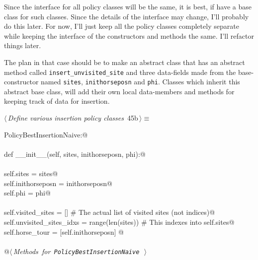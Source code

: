 \documentclass[11.5pt]{report}
\begin{document}
\newchunk Since the interface for all policy classes will be the same, it is 
best, if have a base class for such classes. Since the details of 
the interface may change, I'll probably do this later. For now, 
I'll just keep all the policy classes completely separate while 
keeping the interface of the constructors and methods the same. 
I'll refactor things later. 

The plan in that case should be to make an abstract class that 
has an abstract method called \texttt{insert\_unvisited\_site}
and three data-fields made from the base-constructor named \texttt{sites}, \texttt{inithorseposn}
and \texttt{phi}. Classes which inherit this abstract base class, will 
add their own local data-members and methods for keeping track of 
data for insertion. 

\begin{flushleft} \small\label{scrap67}\raggedright\small
{} $\langle\,${\itshape Define various insertion policy classes}\nobreak\ {\footnotesize {45b}}$\,\rangle\equiv$
\vspace{-1ex}
\begin{list}{}{} \item
\mbox{}\verb@class PolicyBestInsertionNaive:@\\
\mbox{}\verb@@\\
\mbox{}\verb@    def __init__(self, sites, inithorseposn, phi):@\\
\mbox{}\verb@@\\
\mbox{}\verb@         self.sites           = sites@\\
\mbox{}\verb@         self.inithorseposn   = inithorseposn@\\
\mbox{}\verb@         self.phi             = phi@\\
\mbox{}\verb@@\\
\mbox{}\verb@         self.visited_sites        = []                # The actual list of visited sites (not indices)@\\
\mbox{}\verb@         self.unvisited_sites_idxs = range(len(sites)) # This indexes into self.sites@\\
\mbox{}\verb@         self.horse_tour           = [self.inithorseposn]         @\\
\mbox{}\verb@@\\
\mbox{}\verb@    @\hbox{$\langle\,${\itshape Methods for \verb|PolicyBestInsertionNaive|}\nobreak\ {\footnotesize {}}$\,\rangle$}\verb@@\\
\mbox{}\verb@@{\NWsep}
\end{list}

\end{flushleft}
\end{document}
